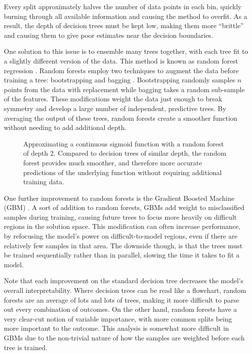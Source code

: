 Every split approximately halves the number of data points in each bin, quickly burning through all available information and causing the method to overfit. As a result, the depth of decision trees must be kept low, making them more “brittle” and causing them to give poor estimates near the decision boundaries. 

One solution to this issue is to ensemble many trees together, with each tree fit to a slightly different version of the data. This method is known as random forest regression \citep{Ho1995RandomForests}. Random forests employ two techniques to augment the data before training a tree: bootstrapping \citep{Ho1995RandomForests} and bagging \citep{Ho2002AConstructors}. Bootstrapping randomly samples $n$ points from the data with replacement while bagging takes a random sub-sample of the features. These modifications weight the data just enough to break symmetry and develop a large number of independent, predictive trees. By averaging the output of these trees, random forests create a smoother function without needing to add additional depth. 

\begin{figure}
\caption{Approximating a continuous sigmoid function with a random forest of depth 2. Compared to decision trees of similar depth, the random forest provides much smoother, and therefore more accurate predictions of the underlying function without requiring additional training data.}

\centering
\end{figure}

One further improvement to random forests is the Gradient Boosted Machine (GBM) \citep{Friedman2001GreedyMachine}. A sort of addition to random forests, GBMs add weight to misclassified samples during training, causing future trees to focus more heavily on difficult regions in the solution space. This modification can often increase performance, by refocusing the model's power on difficult-to-model regions, even if there are relatively few samples in that area. The downside though, is that the trees must be trained sequentially rather than in parallel, slowing the time it takes to fit a model. 

Note that each improvement on the standard decision tree decreases the model's overall interpretability. Where decision trees can be read like a flowchart, random forests are an average of lots and lots of trees, making it more difficult to parse out every combination of outcomes. On the other hand, random forests have a very clear-cut notion of variable importance, with more common splits being more important to the outcome. This analysis is somewhat more difficult in GBMs due to the non-trivial nature of how the samples are weighted before each tree is trained.  

